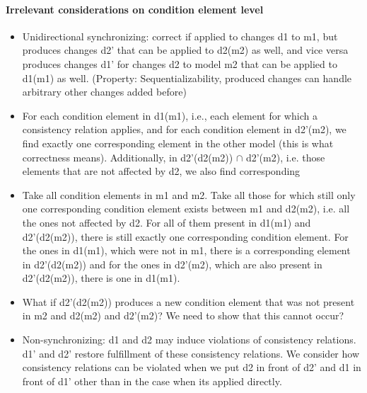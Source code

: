\paragraph{Irrelevant considerations on condition element level}
\begin{itemize}
    \item Unidirectional synchronizing: correct if applied to changes d1 to m1, but produces changes d2' that can be applied to d2(m2) as well, and vice versa produces changes d1' for changes d2 to model m2 that can be applied to d1(m1) as well. (Property: Sequentializability, produced changes can handle arbitrary other changes added before)
    \item For each condition element in d1(m1), i.e., each element for which a consistency relation applies, and for each condition element in d2'(m2), we find exactly one corresponding element in the other model (this is what correctness means). Additionally, in d2'(d2(m2)) $\cap$ d2'(m2), i.e. those elements that are not affected by d2, we also find corresponding 
    
    \item Take all condition elements in m1 and m2. Take all those for which still only one corresponding condition element exists between m1 and d2(m2), i.e. all the ones not affected by d2. For all of them present in d1(m1) and d2'(d2(m2)), there is still exactly one corresponding condition element. For the ones in d1(m1), which were not in m1, there is a corresponding element in d2'(d2(m2)) and for the ones in d2'(m2), which are also present in d2'(d2(m2)), there is one in d1(m1).
    \item What if d2'(d2(m2)) produces a new condition element that was not present in m2 and d2(m2) and d2'(m2)? We need to show that this cannot occur?
    \item Non-synchronizing: d1 and d2 may induce violations of consistency relations. d1' and d2' restore fulfillment of these consistency relations. We consider how consistency relations can be violated when we put d2 in front of d2' and d1 in front of d1' other than in the case when its applied directly.
\end{itemize}


